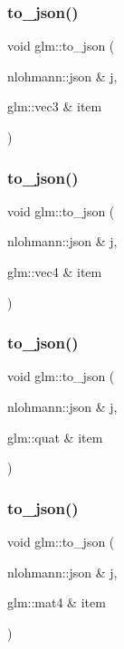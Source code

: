 \subsubsection{\texorpdfstring{to\+\_\+json()}{to\_json()}\hspace{0.1cm}{\footnotesize\ttfamily [2/5]}}
{\footnotesize\ttfamily void glm\+::to\+\_\+json (\begin{DoxyParamCaption}\item[{nlohmann\+::json \&}]{j,  }\item[{glm\+::vec3 \&}]{item }\end{DoxyParamCaption})}

\mbox{\label{namespaceglm_a2a60e38f026e0c50e09fe04b72470461}} 
\subsubsection{\texorpdfstring{to\+\_\+json()}{to\_json()}\hspace{0.1cm}{\footnotesize\ttfamily [3/5]}}
{\footnotesize\ttfamily void glm\+::to\+\_\+json (\begin{DoxyParamCaption}\item[{nlohmann\+::json \&}]{j,  }\item[{glm\+::vec4 \&}]{item }\end{DoxyParamCaption})}

\mbox{\label{namespaceglm_a999a1ff9d6cd226d931984af1b7e8f6d}} 
\subsubsection{\texorpdfstring{to\+\_\+json()}{to\_json()}\hspace{0.1cm}{\footnotesize\ttfamily [4/5]}}
{\footnotesize\ttfamily void glm\+::to\+\_\+json (\begin{DoxyParamCaption}\item[{nlohmann\+::json \&}]{j,  }\item[{glm\+::quat \&}]{item }\end{DoxyParamCaption})}

\mbox{\label{namespaceglm_adda541f3e45eb5de9100552ea6bf1f2f}} 
\subsubsection{\texorpdfstring{to\+\_\+json()}{to\_json()}\hspace{0.1cm}{\footnotesize\ttfamily [5/5]}}
{\footnotesize\ttfamily void glm\+::to\+\_\+json (\begin{DoxyParamCaption}\item[{nlohmann\+::json \&}]{j,  }\item[{glm\+::mat4 \&}]{item }\end{DoxyParamCaption})}

